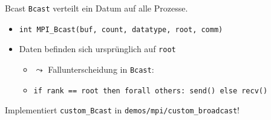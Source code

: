 \documentclass{beamer}
\begin{document}
\begin{frame}{Bcast}
	\texttt{Bcast} verteilt ein Datum auf alle Prozesse.

	\begin{figure}
	\end{figure}

	\begin{itemize}
		\item {\footnotesize \texttt{int MPI_Bcast(buf, count, datatype, root, comm)}}
		\item Daten befinden sich ursprünglich auf \texttt{root} 
		\begin{itemize}
			\item $\leadsto$ Fallunterscheidung in \texttt{Bcast}:
			\item {\footnotesize \texttt{if rank == root then forall others: send() else recv()}}
		\end{itemize}
	\end{itemize}

	\pause
	Implementiert \texttt{custom_Bcast} in \texttt{demos/mpi/custom_broadcast}!
\end{frame}
\end{document}
